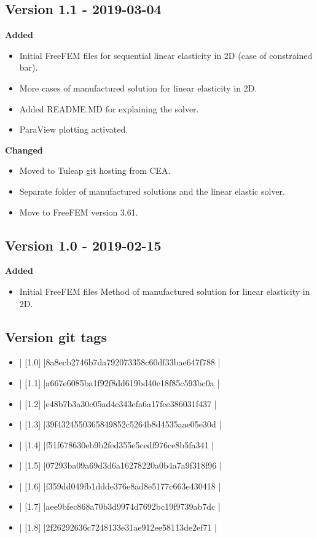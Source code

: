 \documentclass{report}
\begin{document}
\subsection{Version 1.1 - 2019-03-04}

\textbf{Added}
\begin{itemize}
\item Initial FreeFEM files for sequential linear elasticity in 2D (case of constrained bar).
\item More cases of manufactured solution for linear elasticity in 2D.
\item Added {\ttfamily README.MD} for explaining the solver.
\item ParaView plotting activated.
\end{itemize}

\textbf{Changed}
\begin{itemize}
\item Moved to Tuleap git hosting from CEA.
\item Separate folder of manufactured solutions and the linear elastic solver.
\item Move to FreeFEM version 3.61.
\end{itemize}

\subsection{Version 1.0 - 2019-02-15}

\textbf{Added}
\begin{itemize}
\item Initial FreeFEM files  Method of manufactured solution for linear elasticity in 2D.
\end{itemize}

\subsection{Version git tags}
\begin{itemize}
\item | [1.0]      |8a8ecb2746b7da792073358c60df33bae647f788 |
\item | [1.1]     |a667e6085ba1f92f8dd619bd40e18f85c593bc0a |
\item | [1.2]        |e48b7b3a30c05ad4c343efa6a17fee386031f437 |
\item | [1.3]       |39f4324550365849852c5264b8d4535aae05e30d |
\item | [1.4]        |f51f678630eb9b2fed355e5cedf976ce8b5fa341 |
\item | [1.5]        |07293ba09a69d3d6a16278220a0b4a7a9f318f96 |
\item | [1.6]        |f359dd049fb1ddde376e8ad8e5177c663e430418 |
\item | [1.7]       |aee9bfec868a70b3d9974d7692bc19f9739ab7dc |
\item | [1.8]       |2f26292636c7248133e31ae912ee58113de2ef71 |
\end{itemize}
\end{document}
